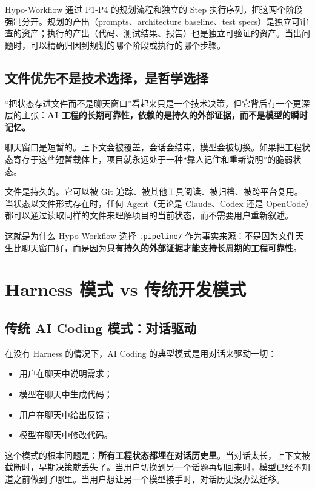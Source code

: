\documentclass[
  outputdir=build,
  chapterstyle=cn,
  colorscheme=Simple,
  fontset=tech,
  code=false
]{Hypo-Note}
\begin{document}
Hypo-Workflow 通过 P1-P4 的规划流程和独立的 Step 执行序列，把这两个阶段强制分开。规划的产出（prompts、architecture baseline、test specs）是独立可审查的资产；执行的产出（代码、测试结果、报告）也是独立可验证的资产。当出问题时，可以精确归因到规划的哪个阶段或执行的哪个步骤。

\subsection{文件优先不是技术选择，是哲学选择}

“把状态存进文件而不是聊天窗口”看起来只是一个技术决策，但它背后有一个更深层的主张：\textbf{AI 工程的长期可靠性，依赖的是持久的外部证据，而不是模型的瞬时记忆。}

聊天窗口是短暂的。上下文会被覆盖，会话会结束，模型会被切换。如果把工程状态寄存于这些短暂载体上，项目就永远处于一种“靠人记住和重新说明”的脆弱状态。

文件是持久的。它可以被 Git 追踪、被其他工具阅读、被归档、被跨平台复用。当状态以文件形式存在时，任何 Agent（无论是 Claude、Codex 还是 OpenCode）都可以通过读取同样的文件来理解项目的当前状态，而不需要用户重新叙述。

这就是为什么 Hypo-Workflow 选择 \texttt{.pipeline/} 作为事实来源：不是因为文件天生比聊天窗口好，而是因为\textbf{只有持久的外部证据才能支持长周期的工程可靠性}。

\section{Harness 模式 vs 传统开发模式}

\subsection{传统 AI Coding 模式：对话驱动}

在没有 Harness 的情况下，AI Coding 的典型模式是用对话来驱动一切：

\begin{itemize}[leftmargin=2em]
  \item 用户在聊天中说明需求；
  \item 模型在聊天中生成代码；
  \item 用户在聊天中给出反馈；
  \item 模型在聊天中修改代码。
\end{itemize}

这个模式的根本问题是：\textbf{所有工程状态都埋在对话历史里}。当对话太长，上下文被截断时，早期决策就丢失了。当用户切换到另一个话题再切回来时，模型已经不知道之前做到了哪里。当用户想让另一个模型接手时，对话历史没办法迁移。
\end{document}
